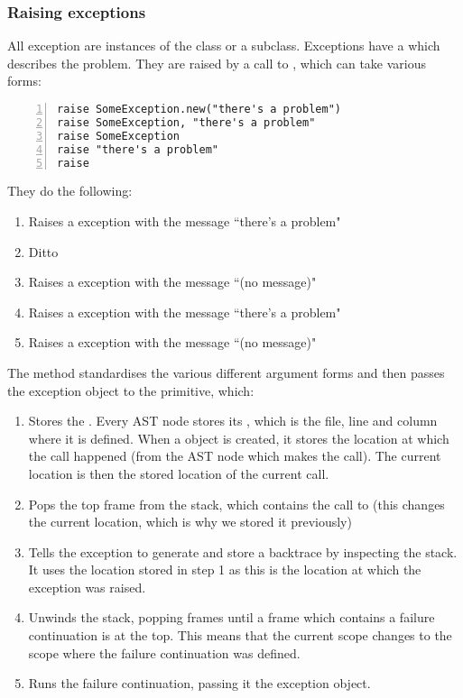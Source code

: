 \subsubsection{Raising exceptions}

All exception are instances of the  class or a subclass. Exceptions have a  which describes the problem. They are raised by a call to , which can take various forms:

\begin{lstlisting}[numbers=left]
raise SomeException.new("there's a problem")
raise SomeException, "there's a problem"
raise SomeException
raise "there's a problem"
raise
\end{lstlisting}

They do the following:

\begin{enumerate}
  \item Raises a  exception with the message ``there's a problem"
  \item Ditto
  \item Raises a  exception with the message ``(no message)"
  \item Raises a  exception with the message ``there's a problem"
  \item Raises a  exception with the message ``(no message)"
\end{enumerate}

The  method standardises the various different argument forms and then passes the exception object to the  primitive, which:

\begin{enumerate}
  \item Stores the . Every AST node stores its , which is the file, line and column where it is defined. When a  object is created, it stores the location at which the call happened (from the AST node which makes the call). The current location is then the stored location of the current call.
  
  \item Pops the top frame from the stack, which contains the call to  (this changes the current location, which is why we stored it previously)
  
  \item Tells the exception to generate and store a backtrace by inspecting the stack. It uses the location stored in step 1 as this is the location at which the exception was raised.
  
  \item Unwinds the stack, popping frames until a frame which contains a failure continuation is at the top. This means that the current scope changes to the scope where the failure continuation was defined.
  
  \item Runs the failure continuation, passing it the exception object.
\end{enumerate}

